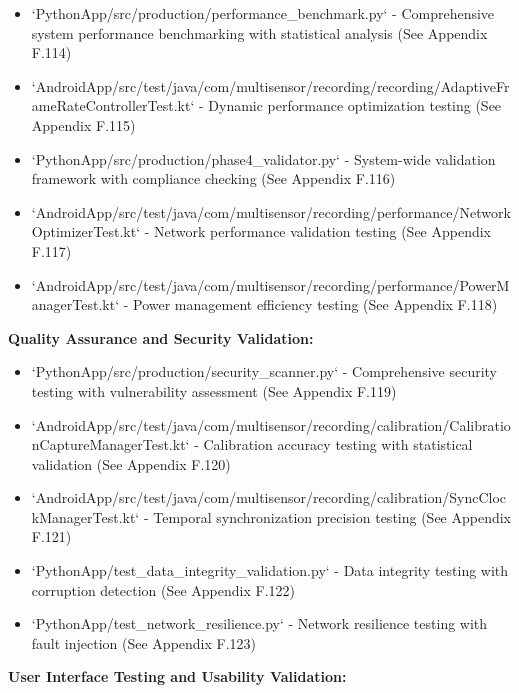 \documentclass[12pt,a4paper]{report}
\begin{document}
\begin{itemize}
\item `PythonApp/src/production/performance_benchmark.py` - Comprehensive system performance benchmarking with statistical
  analysis (See Appendix F.114)
\item `AndroidApp/src/test/java/com/multisensor/recording/recording/AdaptiveFrameRateControllerTest.kt` - Dynamic
  performance optimization testing (See Appendix F.115)
\item `PythonApp/src/production/phase4_validator.py` - System-wide validation framework with compliance checking (See
  Appendix F.116)
\item `AndroidApp/src/test/java/com/multisensor/recording/performance/NetworkOptimizerTest.kt` - Network performance
  validation testing (See Appendix F.117)
\item `AndroidApp/src/test/java/com/multisensor/recording/performance/PowerManagerTest.kt` - Power management efficiency
  testing (See Appendix F.118)

\end{itemize}
\textbf{Quality Assurance and Security Validation:}

\begin{itemize}
\item `PythonApp/src/production/security_scanner.py` - Comprehensive security testing with vulnerability assessment (See
  Appendix F.119)
\item `AndroidApp/src/test/java/com/multisensor/recording/calibration/CalibrationCaptureManagerTest.kt` - Calibration
  accuracy testing with statistical validation (See Appendix F.120)
\item `AndroidApp/src/test/java/com/multisensor/recording/calibration/SyncClockManagerTest.kt` - Temporal synchronization
  precision testing (See Appendix F.121)
\item `PythonApp/test_data_integrity_validation.py` - Data integrity testing with corruption detection (See Appendix F.122)
\item `PythonApp/test_network_resilience.py` - Network resilience testing with fault injection (See Appendix F.123)

\end{itemize}
\textbf{User Interface Testing and Usability Validation:}
\end{document}
